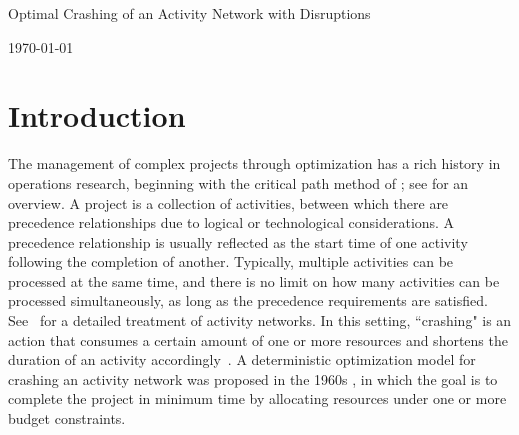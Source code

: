 \documentclass[11pt]{article}
\newcommand{\ms}{\medskip}
\begin{document}
\baselineskip0.25in

\begin{center}
\begin{large}
\begin{bf}

Optimal Crashing of an Activity Network with Disruptions \ms

\today \ms
\end{bf}
\end{large}
\end{center}

\section{Introduction} \label{sec:introduction}
	The management of complex projects through optimization has a rich history in operations research, beginning with the critical path method of \cite{kelley1961criticalpath}; see \citet{soderlund2004building} for an overview. A project is a collection of activities, between which there are precedence relationships due to logical or technological considerations. A precedence relationship is usually reflected as the start time of one activity following the completion of another. 
	Typically, multiple activities can be processed at the same time, and there is no limit on how many activities can be processed simultaneously, as long as the precedence requirements are satisfied. See~\citet{Elmaghraby77} for a detailed treatment of activity networks. In this setting, ``crashing" is an action that consumes a certain amount of one or more resources and shortens the duration of an activity accordingly~\citep{kuhl2008dynamic}. A deterministic optimization model for crashing an activity network was proposed in the 1960s \citep{fulkerson1961network, kelley1961criticalpath}, in which the goal is to complete the project in minimum time by allocating resources under one or more budget constraints.
	
\end{document}

